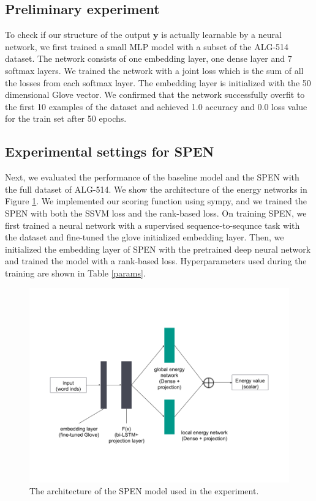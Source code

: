 \documentclass[11pt,letterpaper]{article}
\begin{document}
\subsection{Preliminary experiment}
To check if our structure of the output $\mathbf{y}$ is actually learnable by a neural network, we first trained a small MLP model with a subset of the ALG-514 dataset. The network consists of one embedding layer, one dense layer and 7 softmax layers. We trained the network with a joint loss which is the sum of all the losses from each softmax layer. The embedding layer is initialized with the 50 dimensional Glove vector. We confirmed that the network successfully overfit to the first 10 examples of the dataset and achieved 1.0 accuracy and 0.0 loss value for the train set after 50 epochs.
%
\subsection{Experimental settings for SPEN}
Next, we evaluated the performance of the baseline model and the SPEN with the full dataset of ALG-514. We show the architecture of the energy networks in Figure \ref{spen-architecture}. We implemented our scoring function using sympy, and we trained the SPEN with both the SSVM loss and the rank-based loss. On training SPEN, we first trained a neural network with a supervised sequence-to-sequnce task with the dataset and fine-tuned the glove initialized embedding layer. Then, we initialized the embedding layer of SPEN with the pretrained deep neural network and trained the model with a rank-based loss. Hyperparameters used during the training are shown in Table \ref{params}.
\begin{figure}[ht]
	\centering
	\hspace*{-10mm}
	\includegraphics[bb=0 0 960 720, scale=0.28]{spen_architecture.png}%
    \caption{The architecture of the SPEN model used in the experiment.}
    \label{spen-architecture}
\end{figure}
\end{document}
